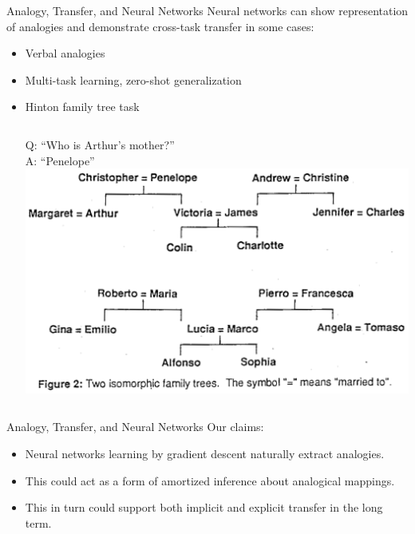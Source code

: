 \documentclass{beamer}
\begin{document}
\begin{frame}{Analogy, Transfer, and Neural Networks}
Neural networks can show representation of analogies and demonstrate cross-task transfer in some cases: 
\begin{itemize}
    \item<2-> Verbal analogies \cite{Kollias2013}
    \item<3-> Multi-task learning, zero-shot generalization \cite{Luong2016,Johnson2016}  
    \item<4-> Hinton family tree task \cite{Hinton1986}
    \begin{columns}
     Q: ``Who is Arthur's mother?'' \\ A: ``Penelope'' %
	\includegraphics[width = \textwidth]{../writing/cogsci_2017/figures/hinton_family_tree_figure.png}
    \end{columns}
\end{itemize}
\end{frame}

\begin{frame}{Analogy, Transfer, and Neural Networks}
Our claims:
\begin{itemize}
    \item<1-> Neural networks learning by gradient descent naturally extract analogies. 
    \item<2-> This could act as a form of amortized inference about analogical mappings.
    \item<3-> This in turn could support both implicit and explicit transfer in the long term. 
\end{itemize}
\end{frame}
\end{document}
